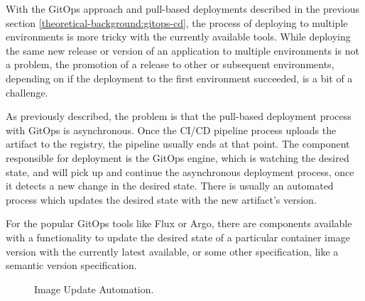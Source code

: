 With the GitOps approach and pull-based deployments described in the previous section \ref{theoretical-background:gitops-cd},
the process of deploying to multiple environments is more tricky with the currently available tools.
While deploying the same new release or version of an application to multiple environments is not a problem,
the promotion of a release to other or subsequent environments, depending on if the deployment to the first environment succeeded,
is a bit of a challenge.

As previously described, the problem is that the pull-based deployment process with GitOps is asynchronous.
Once the CI/CD pipeline process uploads the artifact to the registry, the pipeline usually ends at that point.
The component responsible for deployment is the GitOps engine, which is watching the desired state,
and will pick up and continue the asynchronous deployment process, once it detects a new change in the desired state.
There is usually an automated process which updates the desired state with the new artifact's version.


For the popular GitOps tools like Flux or Argo,
there are components available with a functionality to update the desired state
of a particular container image version with the currently latest available, or some other specification, like a semantic version specification.

\begin{figure}[h]
	\centering
	\caption{Image Update Automation.
	}
	\label{fig:image-update-automation-illustration}	
\end{figure}

